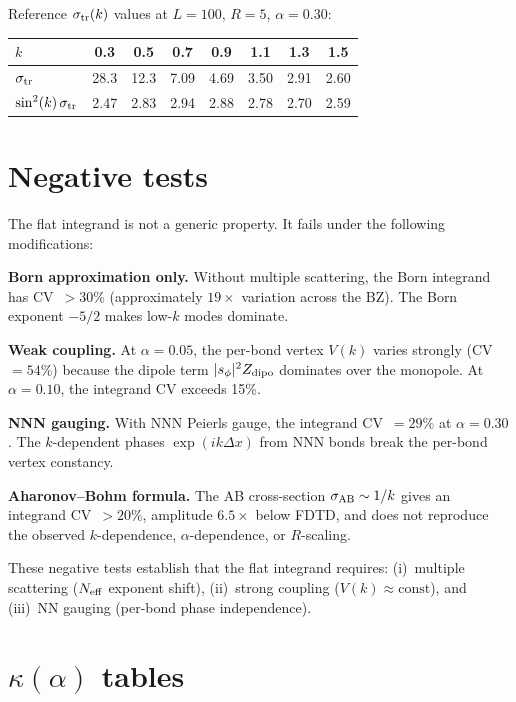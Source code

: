 \documentclass[11pt]{article}
\begin{document}
Reference $\sigma_{\rm tr}(k)$ values at $L = 100$, $R = 5$,
$\alpha = 0.30$:

\begin{table}[h]
\begin{tabular}{lccccccc}
\hline
$k$ & 0.3 & 0.5 & 0.7 & 0.9 & 1.1 & 1.3 & 1.5 \\
\hline
$\sigma_{\rm tr}$ & 28.3 & 12.3 & 7.09 & 4.69 & 3.50 & 2.91 & 2.60 \\
$\sin^2(k)\,\sigma_{\rm tr}$ & 2.47 & 2.83 & 2.94 & 2.88 & 2.78 & 2.70 & 2.59 \\
\hline
\end{tabular}
\end{table}

\section{Negative tests}
\label{sec:negative}

The flat integrand is not a generic property. It fails under the following
modifications:

\textbf{Born approximation only.}
Without multiple scattering, the Born integrand has CV~$> 30\%$
(approximately $19\times$ variation across the BZ). The Born exponent $-5/2$
makes low-$k$ modes dominate.

\textbf{Weak coupling.}
At $\alpha = 0.05$, the per-bond vertex $V(k)$ varies strongly
(CV~$= 54\%$) because the dipole term $|s_\phi|^2 Z_{\rm dipo}$ dominates
over the monopole. At $\alpha = 0.10$, the integrand CV exceeds 15\%.

\textbf{NNN gauging.}
With NNN Peierls gauge, the integrand CV~$= 29\%$ at $\alpha = 0.30$. The
$k$-dependent phases $\exp(ik\Delta x)$ from NNN bonds break the per-bond
vertex constancy.

\textbf{Aharonov--Bohm formula.}
The AB cross-section $\sigma_{\rm AB} \sim 1/k$ gives an integrand
CV~$> 20\%$, amplitude $6.5\times$ below FDTD, and does not reproduce the
observed $k$-dependence, $\alpha$-dependence, or $R$-scaling.

These negative tests establish that the flat integrand requires: (i)~multiple
scattering ($N_{\rm eff}$ exponent shift), (ii)~strong coupling
($V(k) \approx \mathrm{const}$), and (iii)~NN gauging (per-bond phase
independence).

\section{\texorpdfstring{$\kappa(\alpha)$}{kappa(alpha)} tables}
\label{sec:kappa}
\end{document}
